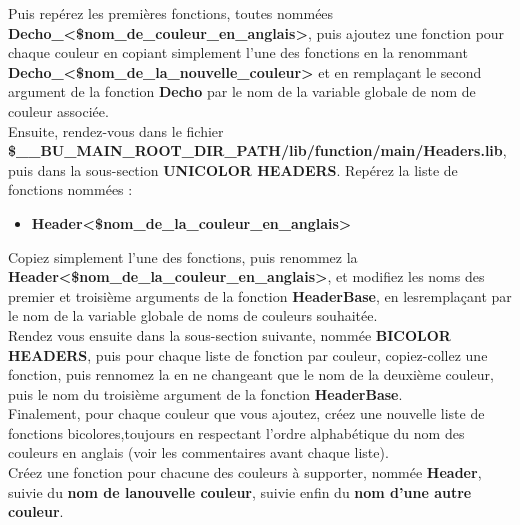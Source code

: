 \documentclass[a4paper,10pt]{article}
\begin{document}
Puis repérez les premières fonctions, toutes nommées \textbf{\color{mauve}Decho\_<\$nom\_de\_couleur\_en\_anglais>}, puis ajoutez une fonction pour chaque couleur en copiant simplement l'une des fonctions en la renommant \textbf{\color{mauve}Decho\_<\$nom\_de\_la\_nouvelle\_couleur>} et en remplaçant le second argument de la fonction \textbf{\color{mauve}Decho} par le nom de la variable globale de nom de couleur associée.\\[2\baselineskip]


Ensuite, rendez-vous dans le fichier \textbf{\color{orange}\$\_\_BU\_MAIN\_ROOT\_DIR\_PATH\color{lime}/lib/function/main/Headers.lib}, puis dans la sous-section \textbf{UNICOLOR HEADERS}. Repérez la liste de fonctions nommées :
\begin{itemize}
    \item \textbf{\color{mauve}Header<\$nom\_de\_la\_couleur\_en\_anglais>}\linebreak
\end{itemize}

Copiez simplement l'une des fonctions, puis renommez la \textbf{\color{mauve}Header<\$nom\_de\_la\_couleur\_en\_anglais>}, et modifiez les noms des premier et troisième arguments de la fonction \textbf{\color{mauve}HeaderBase}, en les\linebreak remplaçant par le nom de la variable globale de noms de couleurs souhaitée.\\[1\baselineskip]

Rendez vous ensuite dans la sous-section suivante, nommée \textbf{BICOLOR HEADERS}, puis pour chaque liste de fonction par couleur, copiez-collez une fonction, puis rennomez la en ne changeant que le nom de la deuxième couleur, puis le nom du troisième argument de la fonction \textbf{\color{mauve}HeaderBase}.\\[1\baselineskip]

Finalement, pour chaque couleur que vous ajoutez, créez une nouvelle liste de fonctions bicolores,\linebreak toujours en respectant l'ordre alphabétique du nom des couleurs en anglais (voir les commentaires avant chaque liste).\\[1\baselineskip]

Créez une fonction pour chacune des couleurs à supporter, nommée \textbf{\color{mauve}Header}, suivie du \textbf{\color{mauve}nom de la\linebreak nouvelle couleur}, suivie enfin du \textbf{\color{mauve}nom d'une autre couleur}.\\[1\baselineskip]
\end{document}
